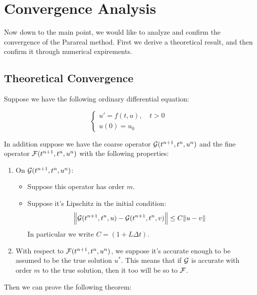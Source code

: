 \section{Convergence Analysis}

Now down to the main point, we would like to analyze and confirm the convergence
of the Parareal method. First we derive a theoretical result, and then confirm
it through numerical expirements.

\subsection{Theoretical Convergence}

Suppose we have the following ordinary differential equation:

\begin{equation}
  \begin{cases}
    u' = f(t,u), \quad t > 0 \\
    u(0) = u_0
  \end{cases}
\end{equation}

In addition suppose we have the coarse operator $\mathcal{G}(t^{n+1},t^n,u^n)$ and
the fine operator $\mathcal{F}(t^{n+1}, t^n, u^n)$ with the following properties:

\begin{enumerate}
  \item On $\mathcal{G}(t^{n+1},t^n,u^n)$:
    \begin{itemize}
      \item Suppose this operator has order $m$.
      \item Suppose it's Lipschitz in the initial condition:
        \[
          \norm{\mathcal{G}(t^{n+1},t^n,u)-\mathcal{G}(t^{n+1},t^n,v)} \leq 
          C\norm{u - v} 
        \]
        In particular we write $C = (1 + L \Delta t)$.
    \end{itemize}
  \item With respect to $\mathcal{F}(t^{n+1}, t^n, u^n)$, we suppose it's accurate
    enough to be assumed to be the true solution $u^*$. This means that if
    $\mathcal{G}$ is accurate with order $m$ to the true solution, then it too will
    be so to $\mathcal{F}$.
\end{enumerate}

Then we can prove the following theorem:


